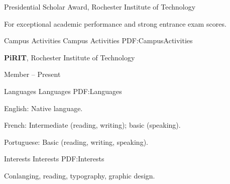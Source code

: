 \documentclass[letterpaper,MMMyyyy,nonstopmode]{simpleresumecv}
\begin{document}
\begin{Body}
\Gap
\BulletItem
Presidential Scholar Award,
Rochester Institute of Technology
\hfill
{}
\begin{Detail}
\Item
For exceptional academic performance and strong entrance exam scores.
\end{Detail}


\Section
{Campus Activities}
{Campus Activities}
{PDF:CampusActivities}

\Entry
{\textbf{PiRIT}},
Rochester Institute of Technology

\Gap
\BulletItem
Member
\hfill
{} --
Present


\Section
{Languages}
{Languages}
{PDF:Languages}

\BulletItem
English: Native language.

\Gap
\BulletItem
French: Intermediate (reading, writing); basic (speaking).

\Gap
\BulletItem
Portuguese: Basic (reading, writing, speaking).


\Section
{Interests}
{Interests}
{PDF:Interests}

\Entry
Conlanging,
reading,
typography,
graphic design.






\end{Body}
\end{document}
